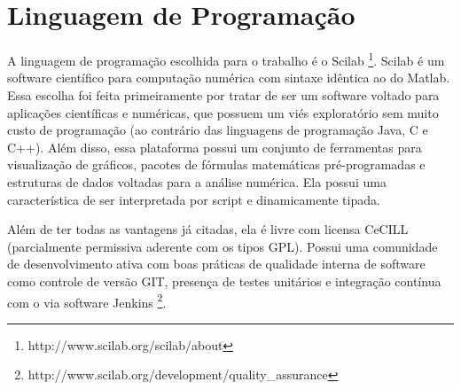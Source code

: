 \section{Linguagem de Programação}
\label{sec:linguagemprogramacao}

A linguagem de programação escolhida para o trabalho é o Scilab \footnote{http://www.scilab.org/scilab/about}. Scilab é um software científico para computação numérica com sintaxe idêntica ao do Matlab. Essa escolha foi feita primeiramente por tratar de ser um software voltado para aplicações científicas e numéricas, que possuem um viés exploratório sem muito custo de programação (ao contrário das linguagens de programação Java, C e C++). Além disso, essa plataforma possui um conjunto de ferramentas para visualização de gráficos, pacotes de fórmulas matemáticas pré-programadas e estruturas de dados voltadas para a análise numérica. Ela possui uma característica de ser interpretada por script e dinamicamente tipada.

Além de ter todas as vantagens já citadas, ela é livre com licensa CeCILL (parcialmente permissiva aderente com os tipos GPL). Possui uma comunidade de desenvolvimento ativa com boas práticas de qualidade interna de software como controle de versão GIT, presença de testes unitários e integração contínua com o via software Jenkins \footnote{http://www.scilab.org/development/quality{\_}assurance}.